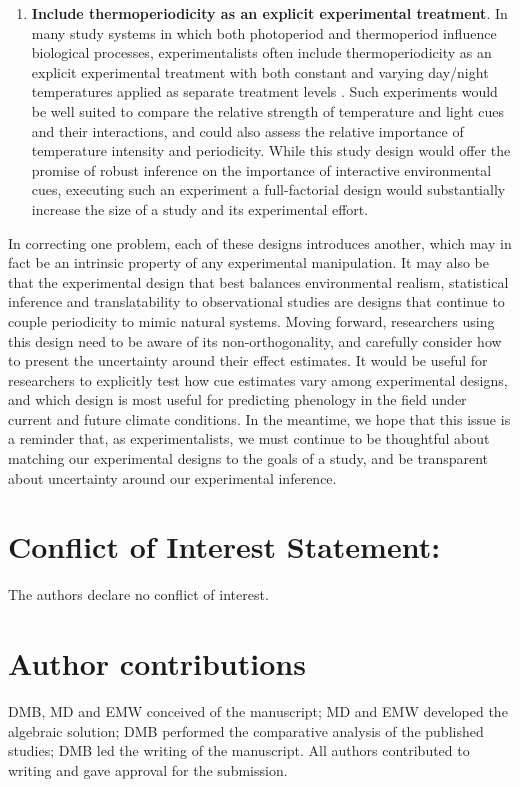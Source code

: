 \documentclass[11pt]{article}
\begin{document}
\begin{enumerate}
\item \textbf{Include thermoperiodicity as an explicit experimental treatment}. In many study systems in which both photoperiod and thermoperiod influence biological processes, experimentalists often include thermoperiodicity as an explicit experimental treatment with both constant and varying day/night temperatures applied as separate treatment levels \citep[e.g.,][]{Zaslavksi_1995}. Such experiments would be well suited to compare the relative strength of temperature and light cues and their interactions, and could also assess the relative importance of temperature intensity and periodicity. While this study design would offer the promise of robust inference on the importance of interactive environmental cues, executing such an experiment a full-factorial design would substantially increase the size of a study and its experimental effort. 
\end{enumerate}

In correcting one problem, each of these designs introduces another, which may in fact be an intrinsic property of any experimental manipulation. It may also be that the experimental design that best balances environmental realism, statistical inference and translatability to observational studies are designs that continue to couple periodicity to mimic natural systems. Moving forward, researchers using this design need to be aware of its non-orthogonality, and carefully consider how to present the uncertainty around their effect estimates. It would be useful for researchers to explicitly test how cue estimates vary among experimental designs, and which design is most useful for predicting phenology in the field under current and future climate conditions. In the meantime, we hope that this issue is a reminder that, as experimentalists, we must continue to be thoughtful about matching our experimental designs to the goals of a study, and be transparent about uncertainty around our experimental inference.

\section*{Conflict of Interest Statement:}
The authors declare no conflict of interest.

\section*{Author contributions}
DMB, MD and EMW conceived of the manuscript; MD and EMW developed the algebraic solution; DMB performed the comparative analysis of the published studies; DMB led the writing of the manuscript. All authors contributed to writing and gave approval for the submission.
\end{document}
